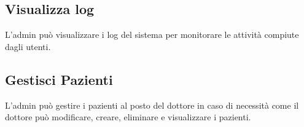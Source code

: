 \documentclass{report}
\begin{document}
\subsection{Visualizza log}
L'admin può visualizzare i log del sistema per monitorare le attività compiute
dagli utenti.

\vspace{0.5cm}


\subsection{Gestisci Pazienti}
L'admin può gestire i pazienti al posto del dottore in caso di necessità
come il dottore può modificare, creare, eliminare e visualizzare i pazienti.

\vspace{0.5cm}
\end{document}
